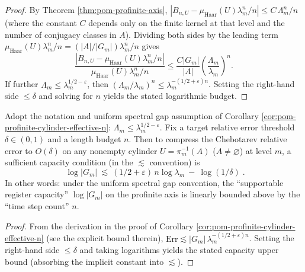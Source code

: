 \begin{proof}
By Theorem \ref{thm:pom-profinite-axis},
\(
|B_{n,U}-\mu_{\mathrm{Haar}}(U)\lambda_m^n/n|\le C\,\Lambda_m^n/n
\)
(where the constant \(C\) depends only on the finite kernel at that level and the number of conjugacy classes in \(A\)).
Dividing both sides by the leading term \(\mu_{\mathrm{Haar}}(U)\lambda_m^n/n=(|A|/|G_m|)\lambda_m^n/n\) gives
\[
\frac{|B_{n,U}-\mu_{\mathrm{Haar}}(U)\lambda_m^n/n|}{\mu_{\mathrm{Haar}}(U)\lambda_m^n/n}
\le
\frac{C|G_m|}{|A|}\left(\frac{\Lambda_m}{\lambda_m}\right)^n.
\]
If further \(\Lambda_m\le \lambda_m^{1/2-\varepsilon}\), then \((\Lambda_m/\lambda_m)^n\le \lambda_m^{-(1/2+\varepsilon)n}\).
Setting the right-hand side \(\le \delta\) and solving for \(n\) yields the stated logarithmic budget.
\end{proof}

\begin{corollary}\label{cor:pom-profinite-cylinder-capacity}
Adopt the notation and uniform spectral gap assumption of Corollary \ref{cor:pom-profinite-cylinder-effective-n}:
\(
\Lambda_m\le \lambda_m^{1/2-\varepsilon}
\).
Fix a target relative error threshold \(\delta\in(0,1)\) and a length budget \(n\).
Then to compress the Chebotarev relative error to \(O(\delta)\) on any nonempty cylinder \(U=\pi_m^{-1}(A)\) (\(A\neq\varnothing\)) at level \(m\), a sufficient capacity condition (in the \(\lesssim\) convention) is
\[
\boxed{\;
\log |G_m|\ \lesssim\ (1/2+\varepsilon)\,n\log\lambda_m\ -\ \log(1/\delta)\; }.
\]
In other words: under the uniform spectral gap convention, the ``supportable register capacity'' \(\log|G_m|\) on the profinite axis is linearly bounded above by the ``time step count'' \(n\).
\end{corollary}
\begin{proof}
From the derivation in the proof of Corollary \ref{cor:pom-profinite-cylinder-effective-n} (see the explicit bound therein),
\(
\mathrm{Err}\lesssim |G_m|\,\lambda_m^{-(1/2+\varepsilon)n}
\).
Setting the right-hand side \(\le \delta\) and taking logarithms yields the stated capacity upper bound (absorbing the implicit constant into \(\lesssim\)).
\end{proof}

